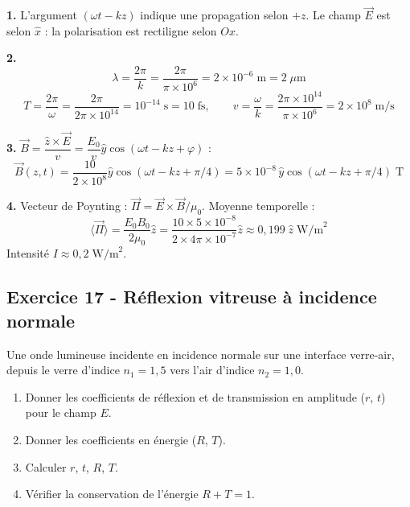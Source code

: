 \documentclass[12pt,a4paper]{article}
\begin{document}
\begin{boitecorrige}
\textbf{1.} L'argument $(\omega t - kz)$ indique une propagation selon $+z$. Le champ $\vec{E}$ est selon $\hat{x}$ : la polarisation est rectiligne selon $Ox$.

\textbf{2.}
\[
\lambda = \frac{2\pi}{k} = \frac{2\pi}{\pi\times10^6} = 2\times10^{-6}\;\text{m} = 2\;\mu\text{m}
\]
\[
T = \frac{2\pi}{\omega} = \frac{2\pi}{2\pi\times10^{14}} = 10^{-14}\;\text{s} = 10\;\text{fs}, \qquad v = \frac{\omega}{k} = \frac{2\pi\times10^{14}}{\pi\times10^6} = 2\times10^8\;\text{m/s}
\]

\textbf{3.} $\vec{B} = \dfrac{\hat{z}\times\vec{E}}{v} = \dfrac{E_0}{v}\hat{y}\cos(\omega t - kz + \varphi)$ :
\[
\vec{B}(z,t) = \frac{10}{2\times10^8}\hat{y}\cos(\omega t - kz + \pi/4) = 5\times10^{-8}\,\hat{y}\cos(\omega t - kz + \pi/4)\;\text{T}
\]

\textbf{4.} Vecteur de Poynting : $\vec{\Pi} = \vec{E}\times\vec{B}/\mu_0$. Moyenne temporelle :
\[
\langle\vec{\Pi}\rangle = \frac{E_0 B_0}{2\mu_0}\hat{z} = \frac{10\times 5\times10^{-8}}{2\times 4\pi\times10^{-7}}\hat{z} \approx 0{,}199\;\hat{z}\;\text{W/m}^2
\]
Intensité $I \approx 0{,}2\;\text{W/m}^2$.
\end{boitecorrige}

\subsection*{Exercice 17 - Réflexion vitreuse à incidence normale \niveau{\moyen}}

\begin{boiteexercice}
Une onde lumineuse incidente en incidence normale sur une interface verre-air, depuis le verre d'indice $n_1 = 1{,}5$ vers l'air d'indice $n_2 = 1{,}0$.
\begin{enumerate}
  \item Donner les coefficients de réflexion et de transmission en amplitude ($r$, $t$) pour le champ $E$.
  \item Donner les coefficients en énergie ($R$, $T$).
  \item Calculer $r$, $t$, $R$, $T$.
  \item Vérifier la conservation de l'énergie $R + T = 1$.
\end{enumerate}
\end{boiteexercice}
\end{document}
